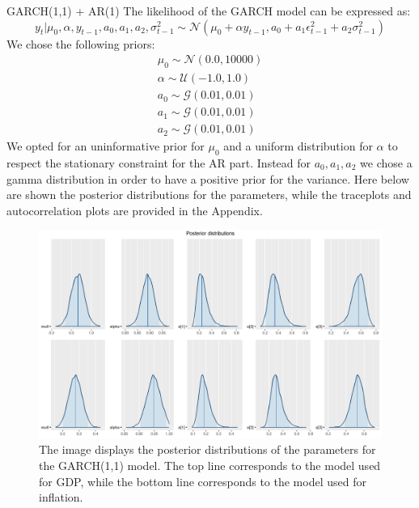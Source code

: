 GARCH(1,1) + AR(1)
The likelihood of the GARCH model can be expressed as:
\begin{equation}
    y_{t}|\mu_{0},\alpha,y_{t-1},a_0,a_1,a_2,\sigma^2_{t-1}\sim \mathcal{N}(\mu_{0} + \alpha y_{t-1}, a_0 + a_1 \epsilon^2_{t-1} + a_2 \sigma^2_{t-1})
\end{equation}
We chose the following priors:
\begin{equation}
    \begin{split}
        \mu_0 \sim \mathcal{N}(0.0, 10000) \\
        \alpha \sim \mathcal{U}(-1.0, 1.0) \\
        a_0 \sim \mathcal{G}(0.01, 0.01) \\
        a_1 \sim \mathcal{G}(0.01, 0.01) \\
        a_2 \sim \mathcal{G}(0.01, 0.01)
    \end{split}
\end{equation}
We opted for an uninformative prior for $\mu_{0}$ and a uniform distribution for $\alpha$ to respect the stationary constraint for the AR part. Instead for $a_0, a_1, a_2$ we chose a gamma distribution in order to have a positive prior for the variance.
Here below are shown the posterior distributions for the parameters, while the traceplots and autocorrelation plots are provided in the Appendix.
\begin{figure}[h]
    \centering
    \includegraphics[width=\textwidth]{../Images/5-GARCH/posteriors.png}
    \caption{The image displays the posterior distributions of the parameters for the GARCH(1,1) model. The top line corresponds to the model used for GDP, while the bottom line corresponds to the model used for inflation.}
    \label{fig:GARCH_posteriors}
\end{figure}

